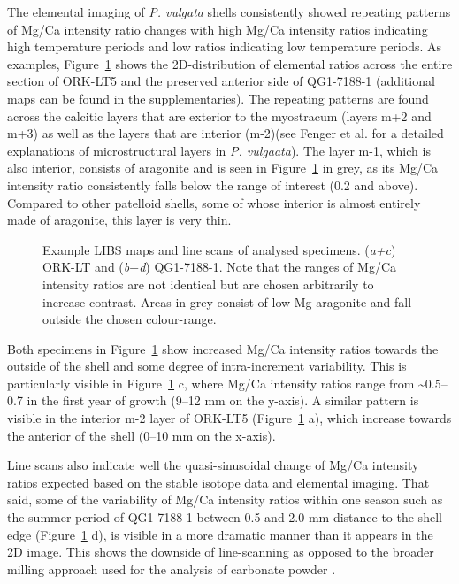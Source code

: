 \documentclass[
  authoryear,
  preprint,
  3p]{elsarticle}
\begin{document}
The elemental imaging of \emph{P. vulgata} shells consistently showed
repeating patterns of Mg/Ca intensity ratio changes with high Mg/Ca
intensity ratios indicating high temperature periods and low ratios
indicating low temperature periods. As examples,
Figure~\ref{fig-Pat_LIBS} shows the 2D-distribution of elemental ratios
across the entire section of ORK-LT5 and the preserved anterior side of
QG1-7188-1 (additional maps can be found in the supplementaries). The
repeating patterns are found across the calcitic layers that are
exterior to the myostracum (layers m+2 and m+3) as well as the layers
that are interior (m-2)(see Fenger et al. \citeyearpar{Fenger2007-gf}
for a detailed explanations of microstructural layers in \emph{P.
vulgaata}). The layer m-1, which is also interior, consists of aragonite
and is seen in Figure~\ref{fig-Pat_LIBS} in grey, as its Mg/Ca intensity
ratio consistently falls below the range of interest (0.2 and above).
Compared to other patelloid shells, some of whose interior is almost
entirely made of aragonite, this layer is very thin. \newline

\begin{figure}[H]


\caption{\label{fig-Pat_LIBS}Example LIBS maps and line scans of
analysed specimens. (\emph{a+c}) ORK-LT and (\emph{b}+\emph{d})
QG1-7188-1. Note that the ranges of Mg/Ca intensity ratios are not
identical but are chosen arbitrarily to increase contrast. Areas in grey
consist of low-Mg aragonite and fall outside the chosen colour-range.}

\end{figure}%

Both specimens in Figure~\ref{fig-Pat_LIBS} show increased Mg/Ca
intensity ratios towards the outside of the shell and some degree of
intra-increment variability. This is particularly visible in
Figure~\ref{fig-Pat_LIBS} c, where Mg/Ca intensity ratios range from
\textasciitilde0.5--0.7 in the first year of growth (9--12 mm on the
y-axis). A similar pattern is visible in the interior m-2 layer of
ORK-LT5 (Figure~\ref{fig-Pat_LIBS} a), which increase towards the
anterior of the shell (0--10 mm on the x-axis).

Line scans also indicate well the quasi-sinusoidal change of Mg/Ca
intensity ratios expected based on the stable isotope data and elemental
imaging. That said, some of the variability of Mg/Ca intensity ratios
within one season such as the summer period of QG1-7188-1 between 0.5
and 2.0 mm distance to the shell edge (Figure~\ref{fig-Pat_LIBS} d), is
visible in a more dramatic manner than it appears in the 2D image. This
shows the downside of line-scanning as opposed to the broader milling
approach used for the analysis of carbonate powder
\citep{Ferguson2011-zl}.
\end{document}
